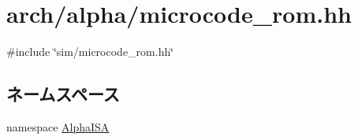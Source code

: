 \hypertarget{arch_2alpha_2microcode__rom_8hh}{
\section{arch/alpha/microcode\_\-rom.hh}
\label{arch_2alpha_2microcode__rom_8hh}
}
{\ttfamily \#include \char`\"{}sim/microcode\_\-rom.hh\char`\"{}}\par
\subsection*{ネームスペース}
\begin{DoxyCompactItemize}
\item 
namespace \hyperlink{namespaceAlphaISA}{AlphaISA}
\end{DoxyCompactItemize}
